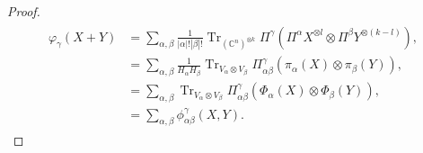\documentclass[10pt,a4paper]{amsart}
\DeclareMathOperator{\Tr}{Tr}
\newcommand{\ot}{\otimes} %
\newcommand{\sya}{|\ya|}
\newcommand{\syb}{|\yb|}
\newcommand{\vp}{\varphi} %
\newcommand{\ya}{\alpha}
\newcommand{\yb}{\beta}
\newcommand{\yc}{\gamma}
\newcommand{\yf}{\phi}
\begin{document}
\begin{proof}
\begin{align}
        \begin{split}
            \vp_\yc(X+Y)
            &= \sum_{\ya, \yb}  \frac{1}{\sya! \syb!} \Tr_{(\mathbb{C}^n)^{\ot k}} \Pi^\yc (\Pi^{\ya}X^{\ot l} \ot \Pi^{\yb} Y^{\ot (k-l)}), \\
            &= \sum_{\ya, \yb}  \frac{1}{H_\ya H_\yb} \Tr_{V_\ya \ot V_\yb} \Pi_{\ya \yb}^\yc  (\pi_\ya(X) \ot \pi_\yb(Y)), \\
            &= \sum_{\ya, \yb}  \Tr_{V_\ya \ot V_\yb} \Pi_{\ya \yb}^\yc  (\Phi_\ya(X) \ot \Phi_\yb(Y)), \\
            &= \sum_{\ya, \yb}  \yf_{\ya \yb}^\yc(X,Y).
        \end{split}
    \end{align}
\end{proof}
\end{document}
